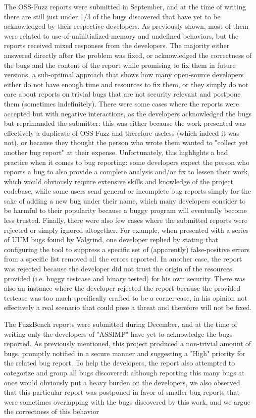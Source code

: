 The OSS-Fuzz reports were submitted in September, and at the time of writing there are still just under 1/3 of the bugs discovered that have yet to be acknowledged by their respective developers. 
As previously shown, most of them were related to use-of-uninitialized-memory and undefined behaviors, but the reports received mixed responses from the developers. The majority either answered directly after the problem was fixed, or acknowledged the correctness of the bugs and the content of the report while promising to fix them in future versions, a sub-optimal approach that shows how many open-source developers either do not have enough time and resources to fix them, or they simply do not care about reports on trivial bugs that are not security relevant and postpone them (sometimes indefinitely). 
There were some cases where the reports were accepted but with negative interactions, as the developers acknowledged the bugs but reprimanded the submitter: this was either because the work presented was effectively a duplicate of OSS-Fuzz and therefore useless (which indeed it was not), or because they thought the person who wrote them wanted to "collect yet another bug report" at their expense. Unfortunately, this highlights a bad practice when it comes to bug reporting: some developers expect the person who reports a bug to also provide a complete analysis and/or fix to lessen their work, which would obviously require extensive skills and knowledge of the project codebase, while some users send general or incomplete bug reports simply for the sake of adding a new bug under their name, which many developers consider to be harmful to their popularity because a buggy program will eventually become less trusted.
Finally, there were also few cases where the submitted reports were rejected or simply ignored altogether. For example, when presented with a series of UUM bugs found by Valgrind, one developer replied by stating that configuring the tool to suppress a specific set of (apparently) false-positive errors from a specific list removed all the errors reported. In another case, the report was rejected because the developer did not trust the origin of the resources provided (i.e. buggy testcase and binary tested) for his own security. There was also an instance where the developer rejected the report because the provided testcase was too much specifically crafted to be a corner-case, in his opinion not effectively a real scenario that could pose a threat and therefore will not be fixed.  

The FuzzBench reports were submitted during December, and at the time of writing only the developers of "ASSIMP" have yet to acknowledge the bugs reported. As previously mentioned, this project produced a non-trivial amount of bugs, promptly notified in a secure manner and suggesting a "High" priority for the related bug report. To help the developers, the report also attempted to categorize and group all bugs discovered: although reporting this many bugs at once would obviously put a heavy burden on the developers, we also observed that this particular report was postponed in favor of smaller bug reports that were sometimes overlapping with the bugs discovered by this work, and we argue the correctness of this behavior     


